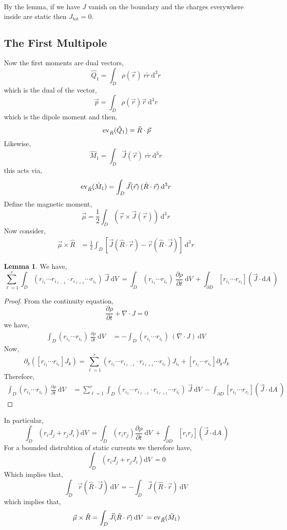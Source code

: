 \documentclass[12pt]{extarticle}
\renewcommand{\d}[1]{ \mathrm{d}#1 \:}
\newcommand{\dn}[2]{ \mathrm{d}^{#1} #2 \:}
\newcommand{\pderiv}[2]{\frac{\partial{#1}}{\partial{#2}}}
\theoremstyle{definition}
\newtheorem{lemma}[theorem]{Lemma}
\begin{document}
By the lemma, if we have $J$ vanish on the boundary and the charges everywhere inside are static then $J_{\text{tot}} = 0$. 

\subsection{The First Multipole}

Now the first moments are dual vectors,
\[ \hat{Q}_1 = \int_D \rho(\vec{r}) \: r \check{r} \: \dn{3}{r} \]
which is the dual of the vector,
\[ \vec{p} = \int_D \rho(\vec{r}) \vec{r} \: \dn{3}{r} \]
which is the dipole moment and then,
\[ \mathrm{ev}_{\hat{R}} (\hat{Q}_1) = \hat{R} \cdot \vec{p} \]
Likewise,
\[ \hat{M}_1 = \int_D \vec{J}(\vec{r}) \: r \check{r} \: \dn{3}{r} \] 
this acts via,
\[ \ev_{\hat{R}} (\hat{M}_1) = \int_D \vec{J}(\vec{r}) \: (\hat{R} \cdot \vec{r}) \: \dn{3}{r} \]
Define the magnetic moment,
\[ \vec{\mu} = \frac{1}{2} \int_D (\vec{r} \times \vec{J}(\vec{r})) \: \dn{3}{r} \]
Now consider,
\begin{align*}
\vec{\mu} \times \hat{R} & = \frac{1}{2} \int_D [ \vec{J} (\hat{R} \cdot \vec{r}) -  \vec{r} (\hat{R} \cdot \vec{J}) ] \: \dn{3}{r}
\end{align*}

\begin{lemma}
We have,
\[ \sum_{\ell = 1}^r  \int_D (r_{i_1} \cdots r_{i_{\ell-1}} \cdot r_{i_{\ell + 1}} \cdots r_{i_r}) \: \vec{J} \: \d{V} = \int_D (r_{i_1} \cdots r_{i_r}) \: \pderiv{\rho}{t} \: \d{V} + \int_{\partial D} [r_{i_1} \cdots r_{r_i}] (\vec{J} \cdot \d{A})  \]
\end{lemma}

\begin{proof}
From the continuity equation,
\[ \pderiv{\rho}{t} + \nabla \cdot J = 0 \]
we have,
\begin{align*}
\int_D (r_{i_1} \cdots r_{i_r}) \: \pderiv{\rho}{t} \: \d{V} & = - \int_D (r_{i_1} \cdots r_{i_r}) \: (\nabla \cdot J) \: \d{V} 
\end{align*}
Now,
\[ \partial_k ([r_{i_1} \cdots r_{i_r}] J_k) = \sum_{\ell = 1}^r (r_{i_1} \cdots r_{i_{\ell-1}} \cdot r_{i_{\ell + 1}} \cdots r_{i_r}) J_{i_\ell} + [r_{i_1} \cdots r_{i_r}] \partial_k J_k  \]
Therefore,
\begin{align*}
\int_D (r_{i_1} \cdots r_{i_r}) \: \pderiv{\rho}{t} \: \d{V} & = \sum_{\ell = 1}^r  \int_D (r_{i_1} \cdots r_{i_{\ell-1}} \cdot r_{i_{\ell + 1}} \cdots r_{i_r}) \: \vec{J} \: \d{V} - \int_{\partial D} [r_{i_1} \cdots r_{r_i}] (\vec{J} \cdot \d{A}) 
\end{align*}
\end{proof}
In particular,
\[ \int_D (r_i J_j + r_j J_i) \d{V} = \int_D (r_i r_j) \pderiv{\rho}{t} \: \d{V} + \int_{\partial D} [r_i r_j] (\vec{J} \cdot \d{A}) \]
For a bounded distrubtion of static currents we therefore have,
\[ \int_D (r_i J_j + r_j J_i) \d{V} = 0 \]
Which implies that,
\[ \int_D \vec{r} (\hat{R} \cdot \vec{J}) \: \d{V} = - \int_D \vec{J} (\hat{R} \cdot \vec{r}) \: \d{V} \]
which implies that,
\[ \vec{\mu} \times \hat{R} = \int_D \vec{J} (\hat{R} \cdot \vec{r}) \: \d{V} = \ev_{\vec{R}}(\hat{M}_1) \]
\end{document}
